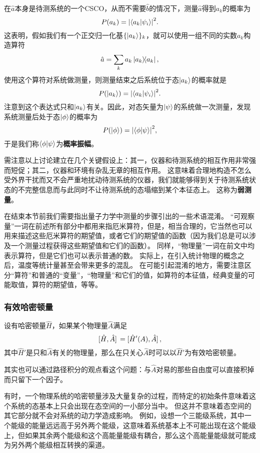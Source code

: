 \documentclass[UTF8, a4paper]{ctexart}
\begin{document}
在$\hat{a}$本身是待测系统的一个CSCO，从而不需要$\hat{b}$的情况下，测量$\hat{a}$得到$a_k$的概率为
\begin{equation}
    P(a_k) = \abs{\braket{a_k}{\psi_i}}^2.
\end{equation}
这表明，假如我们有一个正交归一化基$\{\ket{a_k}\}_k$，就可以使用一组不同的实数$a_k$构造算符
\[
    \hat{a} = \sum_k a_k \dyad{a_k},
\]
使用这个算符对系统做测量，则测量结束之后系统位于态$\ket{a_k}$的概率就是
\begin{equation}
    P(\ket{a_k}) = \abs{\braket{a_k}{\psi_i}}^2.
\end{equation}
注意到这个表达式只和$\ket{a_k}$有关。因此，对态矢量为$\ket{\psi}$的系统做一次测量，发现系统测量后处于态$\ket{\phi}$的概率为
\begin{equation}
    P(\ket{\phi}) = \abs{\braket{\phi}{\psi}}^2,
\end{equation}
于是我们称$\braket{\phi}{\psi}$为\textbf{概率振幅}。

需注意以上讨论建立在几个关键假设上：其一，仪器和待测系统的相互作用非常强而短促；其二，仪器和环境有杂乱无章的相互作用。
这意味着合理地构造不怎么受外界干扰而又不会严重地扰动待测系统的仪器，我们就能够得到关于待测系统状态的不完整信息而与此同时不让待测系统的态塌缩到某个本征态上。
这称为\textbf{弱测量}。

在结束本节前我们需要指出量子力学中测量的步骤引出的一些术语混淆。
“可观察量”一词在前述所有部分中都用来指厄米算符，但是，相当合理的，它当然也可以用来描述这些厄米算符的期望值，或者它们的期望值的函数（因为我们总是可以涉及一个测量过程获得这些期望值和它们的函数）。
同样，“物理量”一词在前文中均表示算符，但是它们也可以表示普通的数。
实际上，在引入统计物理的概念之后，温度等统计量甚至会带来更多的混乱。
在可能引起混淆的地方，需要注意区分“算符”和普通的“变量”，“物理量”和它们的值，如算符的本征值，经典变量的可能取值，算符的期望值，等等。

\subsubsection{有效哈密顿量}

设有哈密顿量$\hat{H}$，如果某个物理量$\hat{A}$满足
\[
    \comm*{\hat{H}}{\hat{A}} = \comm*{\hat{H}'(A)}{\hat{A}},
\]
其中$\hat{H}'$是只和$\hat{A}$有关的物理量，那么在只关心$\hat{A}$时可以以$\hat{H}'$为有效哈密顿量。

其实也可以通过路径积分的观点看这个问题：与$\hat{A}$对易的那些自由度可以直接积掉而只留下一个因子。

有时，一个物理系统的哈密顿量涉及大量复杂的过程，而特定的初始条件意味着这个系统的态基本上只会出现在态空间的一小部分当中。
但这并不意味着态空间的其它部分就不会对系统的动力学造成影响。
例如，设想一个三能级系统，其中一个能级的能量远远高于另外两个能级，这意味着系统基本上不可能出现在这个能级上，但如果其余两个能级和这个高能量能级有耦合，那么这个高能量能级就可能成为另外两个能级相互转换的渠道。
\end{document}
